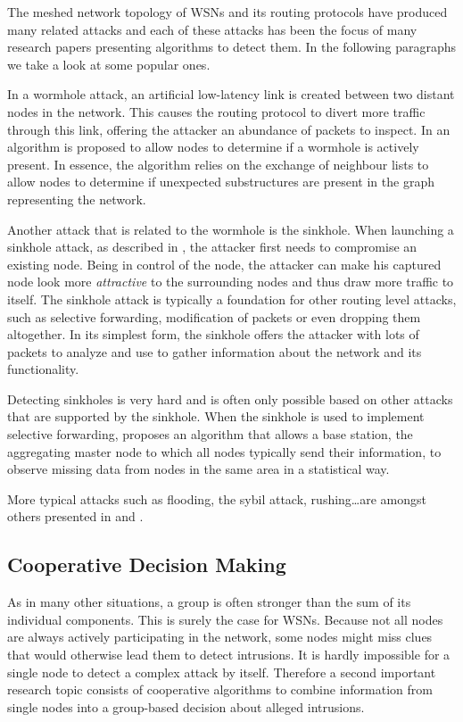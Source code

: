 \documentclass[conference]{IEEEtran}
\begin{document}
The meshed network topology of WSNs and its routing protocols have produced
many related attacks and each of these attacks has been the focus of many
research papers presenting algorithms to detect them. In the following
paragraphs we take a look at some popular ones.

In a wormhole attack, an artificial low-latency link is created between two
distant nodes in the network. This causes the routing protocol to divert more
traffic through this link, offering the attacker an abundance of packets to
inspect. In \cite{maheshwari2007detecting} an algorithm is proposed to allow
nodes to determine if a wormhole is actively present. In essence, the algorithm
relies on the exchange of neighbour lists to allow nodes to determine if
unexpected substructures are present in the graph representing the network.

Another attack that is related to the wormhole is the sinkhole. When launching
a sinkhole attack, as described in \cite{krontiris2008launching}, the attacker
first needs to compromise an existing node. Being in control of the node, the
attacker can make his captured node look more \emph{attractive} to the
surrounding nodes and thus draw more traffic to itself. The sinkhole attack is
typically a foundation for other routing level attacks, such as selective
forwarding, modification of packets or even dropping them altogether. In its
simplest form, the sinkhole offers the attacker with lots of packets to analyze
and use to gather information about the network and its functionality.

Detecting sinkholes is very hard and is often only possible based on other
attacks that are supported by the sinkhole. When the sinkhole is used to
implement selective forwarding, \cite{ngai2006intruder} proposes an algorithm
that allows a base station, the aggregating master node to which all nodes
typically send their information, to observe missing data from nodes in the
same area in a statistical way.

More typical attacks such as flooding, the sybil attack, rushing\dots are
amongst others presented in \cite{wood2002denial} and \cite{djenouri2005survey}.

\subsection{Cooperative Decision Making}
\label{subsection:coorperative}

As in many other situations, a group is often stronger than the sum of its
individual components. This is surely the case for WSNs. Because not all nodes
are always actively participating in the network, some nodes might miss clues
that would otherwise lead them to detect intrusions. It is hardly impossible
for a single node to detect a complex attack by itself. Therefore a second
important research topic consists of cooperative algorithms to combine
information from single nodes into a group-based decision about alleged
intrusions.
\end{document}
